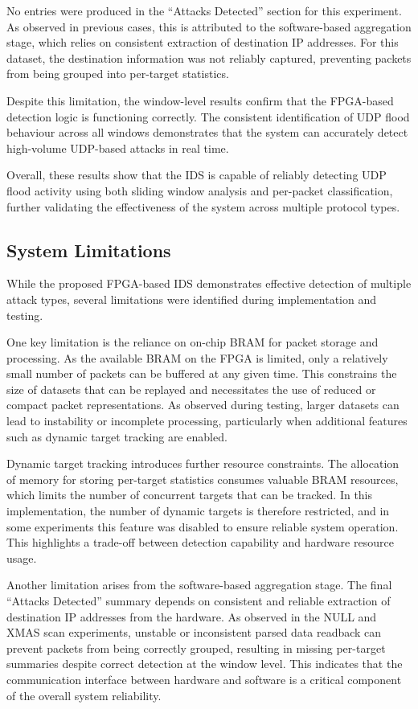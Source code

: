 No entries were produced in the ``Attacks Detected'' section for this
experiment. As observed in previous cases, this is attributed to the
software-based aggregation stage, which relies on consistent extraction of
destination IP addresses. For this dataset, the destination information was not
reliably captured, preventing packets from being grouped into per-target
statistics.

Despite this limitation, the window-level results confirm that the FPGA-based
detection logic is functioning correctly. The consistent identification of UDP
flood behaviour across all windows demonstrates that the system can accurately
detect high-volume UDP-based attacks in real time.

Overall, these results show that the IDS is capable of reliably detecting UDP
flood activity using both sliding window analysis and per-packet
classification, further validating the effectiveness of the system across
multiple protocol types.


\subsection{System Limitations}

While the proposed FPGA-based IDS demonstrates effective detection of multiple
attack types, several limitations were identified during implementation and
testing.

One key limitation is the reliance on on-chip BRAM for packet storage and
processing. As the available BRAM on the FPGA is limited, only a relatively
small number of packets can be buffered at any given time. This constrains the
size of datasets that can be replayed and necessitates the use of reduced or
compact packet representations. As observed during testing, larger datasets can
lead to instability or incomplete processing, particularly when additional
features such as dynamic target tracking are enabled.

Dynamic target tracking introduces further resource constraints. The allocation
of memory for storing per-target statistics consumes valuable BRAM resources,
which limits the number of concurrent targets that can be tracked. In this
implementation, the number of dynamic targets is therefore restricted, and in
some experiments this feature was disabled to ensure reliable system operation.
This highlights a trade-off between detection capability and hardware resource
usage.

Another limitation arises from the software-based aggregation stage. The final
``Attacks Detected'' summary depends on consistent and reliable extraction of
destination IP addresses from the hardware. As observed in the NULL and XMAS
scan experiments, unstable or inconsistent parsed data readback can prevent
packets from being correctly grouped, resulting in missing per-target summaries
despite correct detection at the window level. This indicates that the
communication interface between hardware and software is a critical component
of the overall system reliability.

